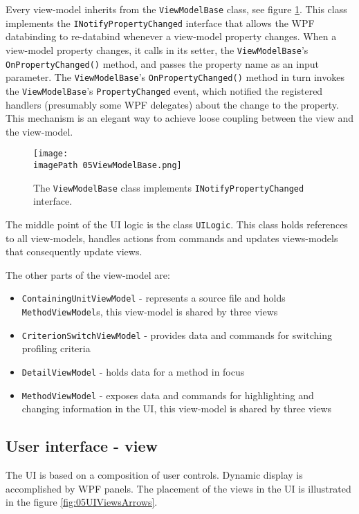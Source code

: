 Every view-model inherits from the \texttt{ViewModelBase} class, see figure \ref{fig:05ViewModelBase}. This class implements the \texttt{INotifyPropertyChanged} interface that allows the WPF databinding to re-databind whenever a view-model property changes. When a view-model property changes, it calls in its setter, the \texttt{ViewModelBase}'s \texttt{OnPropertyChanged()} method, and passes the property name as an input parameter. The \texttt{ViewModelBase}'s \texttt{OnPropertyChanged()} method in turn invokes the \texttt{ViewModelBase}'s \texttt{PropertyChanged} event, which notified the registered handlers (presumably some WPF delegates) about the change to the property. This mechanism is an elegant way to achieve loose coupling between the view and the view-model.
 
 \begin{figure}
	\centering
		\texttt{[image: \\imagePath 05ViewModelBase.png]}
		\caption{The \texttt{ViewModelBase} class implements \texttt{INotifyPropertyChanged} interface.}
	\label{fig:05ViewModelBase}
\end{figure}

The middle point of the UI logic is the class \texttt{UILogic}. This class holds references to all view-models, handles actions from commands and updates views-models that consequently update views.

The other parts of the view-model are:
\begin{itemize}	
\item  \texttt{ContainingUnitViewModel} - represents a source file and holds \texttt{MethodViewModel}s, this view-model is shared by three views	

\item \texttt{CriterionSwitchViewModel} - provides data and commands for switching profiling criteria

\item \texttt{DetailViewModel} - holds data for a method in focus

\item \texttt{MethodViewModel} - exposes data and commands for highlighting and changing information in the UI, this view-model is shared by three views	
\end{itemize}


\subsection{User interface - view}
The UI is based on a composition of user controls. Dynamic display is accomplished by WPF panels. The placement of the views in the UI is illustrated in the figure \ref{fig:05UIViewsArrows}. 

